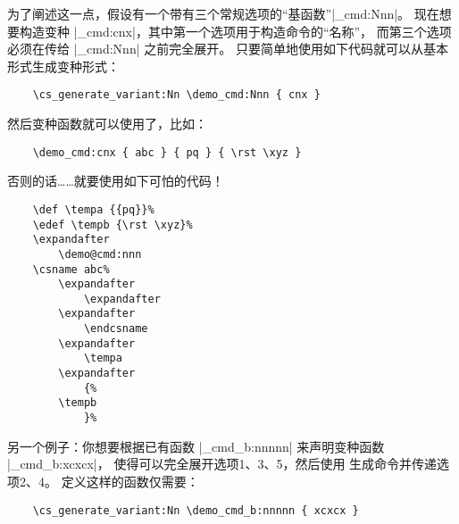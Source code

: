 \documentclass{l3doc}
\begin{document}
%
为了阐述这一点，假设有一个带有三个常规选项的“基函数”|\demo_cmd:Nnn|。
现在想要构造变种  |\demo_cmd:cnx|，其中第一个选项用于构造命令的“名称”，
而第三个选项必须在传给 |\demo_cmd:Nnn| 之前完全展开。
只要简单地使用如下代码就可以从基本形式生成变种形式：
\begin{verbatim}
    \cs_generate_variant:Nn \demo_cmd:Nnn { cnx }
\end{verbatim}
然后变种函数就可以使用了，比如：
\begin{verbatim}
    \demo_cmd:cnx { abc } { pq } { \rst \xyz }
\end{verbatim}
否则的话……就要使用如下可怕的代码！
\begin{verbatim}
    \def \tempa {{pq}}%
    \edef \tempb {\rst \xyz}%
    \expandafter
        \demo@cmd:nnn
    \csname abc%
        \expandafter
            \expandafter
        \expandafter
            \endcsname
        \expandafter
            \tempa
        \expandafter
            {%
        \tempb
            }%
\end{verbatim}

%
另一个例子：你想要根据已有函数 |\demo_cmd_b:nnnnn| 来声明变种函数 |\demo_cmd_b:xcxcx|，
使得可以完全展开选项1、3、5，然后使用  生成命令并传递选项2、4。
定义这样的函数仅需要：
\begin{verbatim}
    \cs_generate_variant:Nn \demo_cmd_b:nnnnn { xcxcx }
\end{verbatim}
\end{document}
